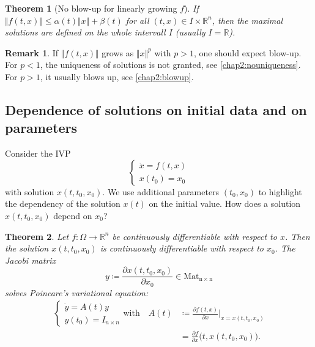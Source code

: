 \documentclass[hidelinks,a4paper, 11pt]{article}
\theoremstyle{plain}
\newtheorem{theorem}{Theorem}
\theoremstyle{break}
\theoremstyle{plain}
\theoremstyle{definition}
\newtheorem*{remark}{Remark}
\begin{document}
\begin{theorem}[No blow-up for linearly growing $f$]
	If $\Vert f(t,x) \Vert \leq \alpha(t)\Vert x \Vert + \beta(t)$ for all $(t,x) \in I \times \mathbb R^n$, then the maximal solutions are defined on the whole intervall $I$ (usually $I = \mathbb R$).
\end{theorem}

\begin{remark}
	If $\Vert f(t,x) \Vert$ grows as $\Vert x \Vert^p$ with $p > 1$, one should expect blow-up. For $p < 1$, the uniqueness of solutions is not granted, see \eqref{chap2:nouniqueness}. For $p > 1$, it usually blows up, see \eqref{chap2:blowup}.\\
	
\end{remark}

\subsection{Dependence of solutions on initial data and on parameters}
Consider the IVP
\[
	\begin{cases}
		\dot x = f(t,x) \\x(t_0) = x_0
	\end{cases}
\]
with solution $x(t,t_0,x_0)$. We use additional parameters $(t_0,x_0)$ to highlight the dependency of the solution $x(t)$ on the initial value. How does a solution $x(t,t_0,x_0)$ depend on $x_0$?

\begin{theorem} \label{chap2:dependenceofsolution.simple} 
	Let $f: \Omega \to \mathbb R^n$ be continuously differentiable with respect to $x$. Then the solution $x(t,t_0,x_0)$ is continuously differentiable with respect to $x_0$. The Jacobi matrix
	\[
		y \coloneqq \frac{\partial x(t,t_0,x_0)}{\partial x_0} \in \mathrm{Mat_{n \times n}}
	\]
	solves \emph{Poincare's variational equation}:
	\begin{align} \label{poincarevariational}
		\begin{cases}
			\dot y = A(t)y  \\
			y(t_0) = I_{n \times n}
		\end{cases} \text{with} \quad  
		A(t) &\coloneqq \frac{\partial f(t,x)}{\partial x} \Big \vert_{x=x(t,t_0,x_0)}  \\
		&= \frac{\partial f}{\partial x}\big(t,x(t,t_0,x_0) \big). \nonumber
	\end{align}
\end{theorem}
\end{document}
